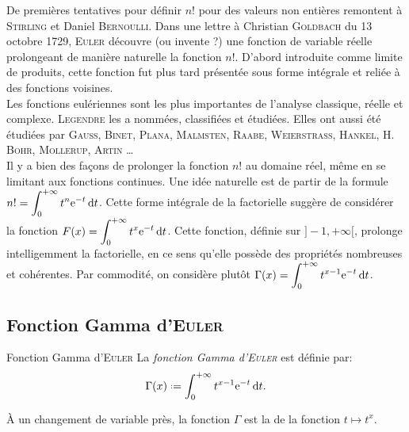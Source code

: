 De premières tentatives pour définir $n!$ pour des valeurs non entières remontent à \textsc{Stirling} et Daniel \textsc{Bernoulli}. Dans une lettre à Christian \textsc{Goldbach} du 13 octobre 1729, \textsc{Euler} découvre (ou invente ?) une fonction de variable réelle prolongeant de manière naturelle la fonction $n!$. D'abord introduite comme limite de produits, cette fonction fut plus tard présentée sous forme intégrale et reliée à des fonctions voisines. \\
Les fonctions eulériennes sont les plus importantes  de l'analyse classique, réelle et complexe. \textsc{Legendre} les a nommées, classifiées et étudiées. Elles ont aussi été étudiées par \textsc{Gauss}, \textsc{Binet}, \textsc{Plana}, \textsc{Malmsten}, \textsc{Raabe}, \textsc{Weierstrass}, \textsc{Hankel}, H. \textsc{Bohr}, \textsc{Mollerup}, \textsc{Artin} \dots \\
Il y a bien des façons de prolonger la fonction $n!$ au domaine réel, même en se limitant aux fonctions continues. Une idée naturelle est de partir de la formule $\displaystyle n! = \int_{0}^{+ \infty} t^n \mathrm{e}^{-t} \, \mathrm{d} t$. Cette forme intégrale de la factorielle suggère de considérer la fonction $\displaystyle F(x)=\int_{0}^{+ \infty} t^x \mathrm{e}^{-t} \, \mathrm{d} t$. Cette fonction, définie sur $]-1, +\infty[$, prolonge intelligemment la factorielle, en ce sens qu'elle possède des propriétés nombreuses et cohérentes. Par commodité, on considère plutôt $\displaystyle \Gamma(x) = \int_{0}^{+ \infty} t^{x-1} \mathrm{e}^{-t} \, \mathrm{d} t$.

\subsection{Fonction Gamma d'\textsc{Euler}}

%    

\begin{defi}{Fonction Gamma d'\textsc{Euler}}
    La \emph{fonction Gamma d'\textsc{Euler}} est définie par: 
    $$\Gamma(x) \defeq \int_{0}^{+\infty} t^{x-1} \me^{-t} \d t.$$
\end{defi}

\begin{remarque}
    À un changement de variable près, la fonction $\Gamma$ est la  de la fonction $t \mapsto t^x$. 
\end{remarque} 

